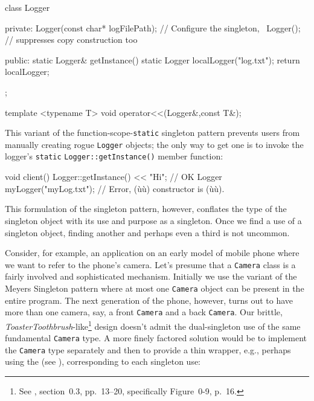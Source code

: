 \begin{emcppslisting}[emcppsbatch=e10]
class Logger
{
private:
    Logger(const char* logFilePath);  // Configure the singleton,
    ~Logger();                        // suppresses copy construction too

public:
    static Logger& getInstance()
    {
        static Logger localLogger("log.txt");
        return localLogger;
    }
};
\end{emcppslisting}
\begin{emcppshiddenlisting}[emcppsbatch=e10]
template <typename T>
void operator<<(Logger&,const T&);
\end{emcppshiddenlisting}

\noindent This variant of the function-scope-\lstinline!static! singleton pattern
prevents users from manually creating rogue \lstinline!Logger! objects; the
only way to get one is to invoke the logger's \lstinline!static!
\lstinline!Logger::getInstance()! member function:

\begin{emcppslisting}[emcppsbatch=e10]
void client()
{
    Logger::getInstance() << "Hi";  // OK
    Logger myLogger("myLog.txt");   // Error, (ù{}ù) constructor is (ù{}ù).
}
\end{emcppslisting}

\noindent This formulation of the singleton pattern, however, conflates the type
of the singleton object with its use and purpose as a singleton. Once we
find a use of a singleton object, finding another and perhaps even a
third is not uncommon.  

Consider, for example, an application on an early
model of mobile phone where we want to refer to the phone's camera.
Let's presume that a \lstinline!Camera! class is a fairly involved and
sophisticated mechanism. Initially we use the variant of the Meyers
Singleton pattern where at most one \lstinline!Camera! object can be
present in the entire program. The next generation of the phone, however, turns out to have more than
one camera, say, a front \lstinline!Camera! and a back \lstinline!Camera!. Our
brittle, \emph{ToasterToothbrush}-like\footnote{See \cite{lakos20}, section~0.3, pp.~13--20, specifically
Figure~0-9, p.~16.} design doesn't
admit the dual-singleton use of the same fundamental \lstinline!Camera!
type. A more finely factored solution would be to implement the
\lstinline!Camera! type separately and then to provide a thin wrapper,
e.g., perhaps using the  (see ), corresponding to each singleton
use:

